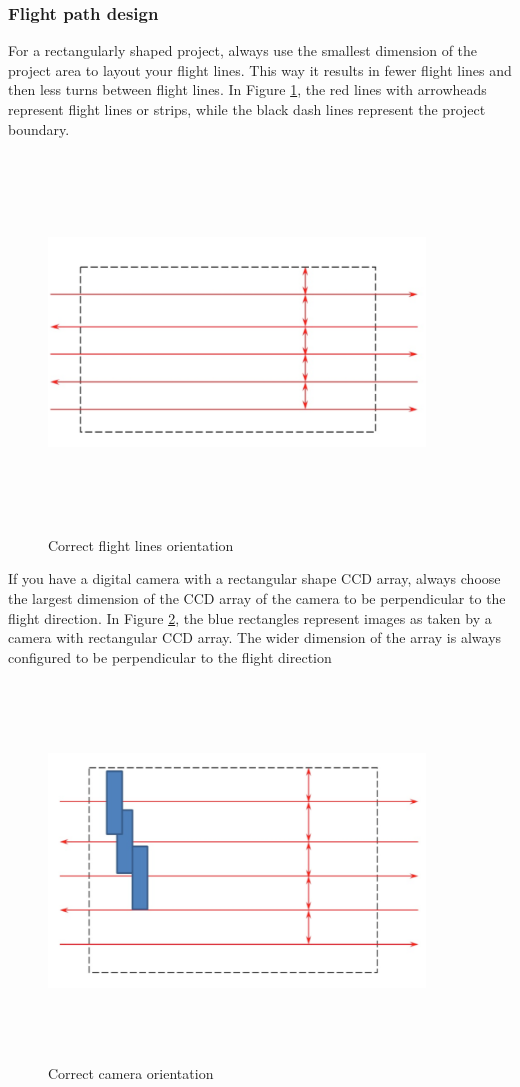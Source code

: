 \subsubsection{Flight path design}
For a rectangularly shaped project, always use the smallest dimension of the project area to layout your flight lines. This way it results in fewer flight lines and then less turns between flight lines. In Figure \ref{fig:line_orientaion}, the red lines with arrowheads represent flight lines or strips, while the black dash lines represent the project boundary.
\begin{figure}[H]
\centering
\includegraphics[width=10cm,height=10cm,keepaspectratio]{imagenes/flight_path.PNG}
\caption{Correct flight lines orientation}
\label{fig:line_orientaion}
\end{figure}
If you have a digital camera with a rectangular shape CCD array, always choose the largest dimension of the CCD array of the camera to be perpendicular to the flight direction. In Figure \ref{fig:camera_orientaion}, the blue rectangles represent images as taken by a camera with rectangular CCD array. The wider dimension of the array is always configured to be perpendicular to the flight direction\cite{GCP}
\begin{figure}[H]
\centering
\includegraphics[width=10cm,height=10cm,keepaspectratio]{imagenes/flight_path_oritentation.PNG}
\caption{Correct camera orientation}
\label{fig:camera_orientaion}
\end{figure}
